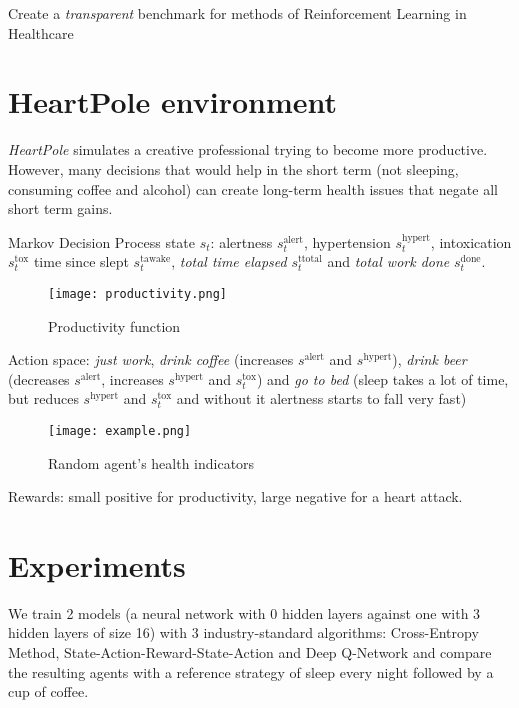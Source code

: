 
Create a \emph{transparent} benchmark for methods of Reinforcement Learning in Healthcare

\section{HeartPole environment}
\label{sec:methodology}

\emph{HeartPole} simulates a creative professional trying to become more productive.
However, many decisions that would help in the short term (not sleeping, consuming coffee and alcohol) can create long-term health issues that negate all short term gains.

Markov Decision Process state $s_t$:  alertness $s^\text{alert}_t$, hypertension $s^\text{hypert}_t$, intoxication $s^\text{tox}_t$ time since slept $s^\text{tawake}_t$, \emph{total time elapsed} $s^\text{ttotal}_t$ and \emph{total work done} $s^\text{done}_t$.

\begin{figure}[H]
    \centering
    \texttt{[image: productivity.png]}
    \caption{Productivity function}
    \label{fig:productivity}
\end{figure}

Action space: \emph{just work}, \emph{drink coffee} (increases $s^\text{alert}$ and $s^\text{hypert}$), \emph{drink beer} (decreases $s^\text{alert}$, increases $s^\text{hypert}$ and $s^\text{tox}_t$) and \emph{go to bed} (sleep takes a lot of time, but reduces $s^\text{hypert}$ and $s^\text{tox}_t$ and without it alertness starts to fall very fast)

\begin{figure}[H]
    \centering
    \texttt{[image: example.png]}
    \caption{Random agent's health indicators}
    \label{fig:random}
\end{figure}

Rewards: small positive for productivity, large negative for a heart attack.

\section{Experiments}
\label{sec:experiments}

We train 2 models (a neural network with 0 hidden layers against one with 3 hidden layers of size 16) with 3 industry-standard algorithms: Cross-Entropy Method, State-Action-Reward-State-Action and Deep Q-Network and compare the resulting agents with a reference strategy of sleep every night followed by a cup of coffee.

